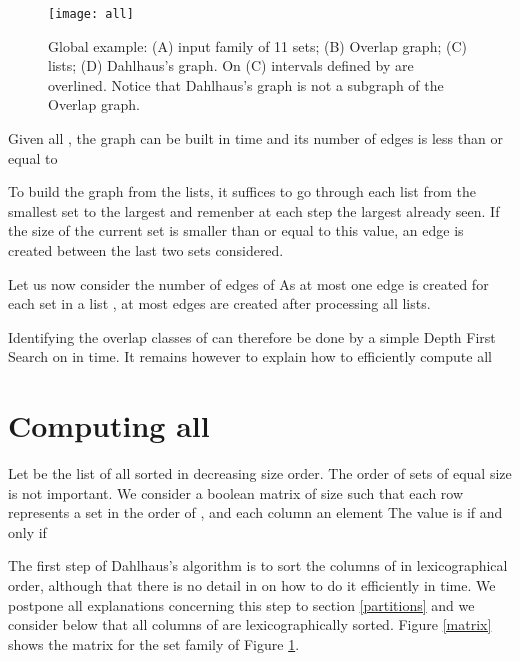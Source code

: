 \documentclass{llncs}
\begin{document}
\begin{figure}[htb]
\vspace{-0.3cm}
  \centering
\texttt{[image: all]}
\caption{Global example: (A) input family of 11 sets; (B) Overlap graph; (C)  lists; (D) Dahlhaus's graph. On (C) intervals defined by  are overlined. Notice that Dahlhaus's graph is not a subgraph of the Overlap graph.}
 \label{allexample}
\vspace{-0.3cm}
\end{figure}

\begin{lemma}
Given all , the graph 
can be built in  time and its number of edges is less
than or equal to 
\end{lemma}
\begin{preuve}
To build the graph  from the  lists, it suffices to
go through each  list from the smallest set to the largest and
remenber at each step the largest  already seen. If the size
of the current set is smaller than or equal to this value, an edge is
created between the last two sets considered.
  
Let us now consider the number of edges of  As at most
one edge is created for each set in a list , at most 
edges are created after processing all lists.
\end{preuve}

Identifying the overlap classes of  can therefore be
done by a simple Depth First Search on  in  time. It remains however to explain how to efficiently compute
all 


\section{Computing all }

Let  be the list of all  sorted in
decreasing size order. The order of sets of equal size is not
important. We consider a boolean matrix  of size  such that each row represents a set 
in the order of , and each column an element  The
value  is  if and only if 

The first step of Dahlhaus's algorithm is to sort the columns of
 in lexicographical order, although that there is no detail
in \cite{Dahlhaus00} on how to do it efficiently in 
time. We postpone all explanations concerning this step to section
\ref{partitions} and we consider below that all columns of  are
lexicographically sorted. Figure \ref{matrix} shows the  matrix
for the set family of Figure \ref{allexample}.
\end{document}
